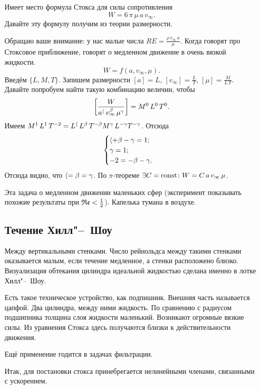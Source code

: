 Имеет место формула Стокса для силы сопротивления
\[
  W = 6\,\pi\,\mu\,a\,v_\infty.
\]
Давайте эту формулу получим из теории размерности.

Обращаю ваше внимание: у нас малые числа $RE = \frac{\rho\, v_\infty\,a}\mu$. Когда говорят про Стоксовое приближение, говорят о медленном движение в очень вязкой жидкости.
\[
  W = f(a,v_\infty,\mu).
\]
Введём $\{L,M,T\}$. Запишем размерности $[a] = L$, $[v_\infty] = \frac LT$, $[\mu] = \frac M{L\,T}$. Давайте попробуем найти такую комбинацию величин, чтобы
\[
  \left[\frac W{a^\langle\,v_\infty^\beta\,\mu^\gamma}\right] = M^0\,L^0\,T^0.
\]
Имеем $M^1\, L^1\, T^{-2} = L^\langle\,L^\beta\, T^{-\beta} M^\gamma\,L^{-\gamma}T^{-\gamma}$. Отсюда
\[
\begin{cases}
  \langle +\beta-\gamma = 1;\\
  \gamma=1;\\
  -2 = -\beta-\gamma.
\end{cases}
\]
Отсюда видно, что $\langle=\beta=\gamma$. По $\pi$-теореме $\exists C=\operatorname{const}\colon W = C\,a\,v_\infty\,\mu$.

Эта задача о медленном движении маленьких сфер (эксперимент показывать похожие результаты при $\mathfrak{Re}<\frac12$). Капелька тумана в воздухе.

\subsection{Течение Хилл"--~Шоу}
Между вертикальными стенками. Число рейнольдса между такими стенками оказывается малым, если течение медленное, а стенки расположено близко. Визуализация обтекания цилиндра идеальной жидкостью сделана именно в лотке Хилл"--~Шоу.

Есть такое техническое устройство, как подпишник. Внешняя часть называется цапфой. Два цилиндра, между ними жидкость. По сравнению с радиусом подшипника толщина слоя жидкости маленький. Возникают огромные вязкие силы. Из уравнения Стокса здесь получаются близки к действительности движения.

Ещё применение годится в задачах фильтрации.

Итак, для постановки стокса принебрегается нелинейными членами, связанными с ускорением.

